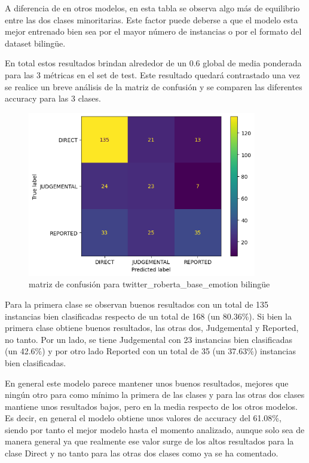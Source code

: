 A diferencia de en otros modelos, en esta tabla se observa algo más de equilibrio entre las dos clases minoritarias. Este factor puede deberse a que el modelo esta mejor entrenado bien sea por el mayor número de instancias o por el formato del dataset bilingüe.

En total estos resultados brindan alrededor de un 0.6 global de media ponderada para las 3 métricas en el set de test. Este resultado quedará contrastado una vez se realice un breve análisis de la matriz de confusión y se comparen las diferentes accuracy para las 3 clases.


\begin{figure}[H]
    \centering
    \includegraphics[width=10cm]{imagenes/Evaluacion/confusion_matrix/twitter_roberta_base_emotion-all-dirty.png}
    \caption{\centering matriz de confusión para twitter\_roberta\_base\_emotion bilingüe}
\end{figure}

Para la primera clase se observan buenos resultados con un total de 135 instancias bien clasificadas respecto de un total de 168 (un 80.36\%). Si bien la primera clase obtiene buenos resultados, las otras dos, Judgemental y Reported, no tanto. Por un lado, se tiene Judgemental con 23 instancias bien clasificadas (un 42.6\%) y por otro lado Reported con un total de 35 (un 37.63\%) instancias bien clasificadas.

En general este modelo parece mantener unos buenos resultados, mejores que ningún otro para como mínimo la primera de las clases y para las otras dos clases mantiene unos resultados bajos, pero en la media respecto de los otros modelos. Es decir, en general el modelo obtiene unos valores de accuracy del 61.08\%, siendo por tanto el mejor modelo hasta el momento analizado, aunque solo sea de manera general ya que realmente ese valor surge de los altos resultados para la clase Direct y no tanto para las otras dos clases como ya se ha comentado.


